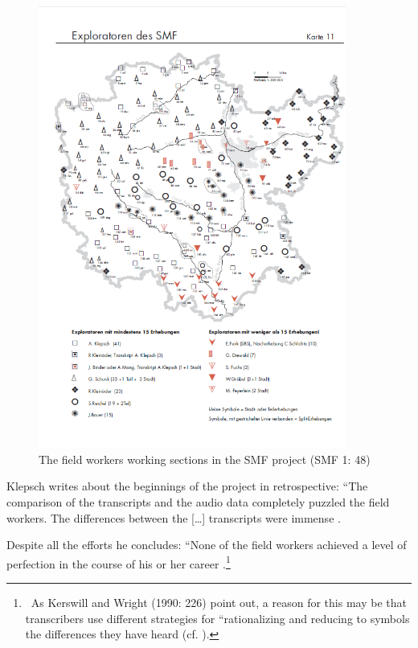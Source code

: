 \documentclass[output=paper]{LSP/langsci}
\begin{document}
\begin{figure}
\includegraphics[width=0.9\textwidth]{illustrations/mathus_fig5}
\caption{The field workers{\textquotesingle} working sections in the SMF project (SMF 1: 48)}
\label{fig:5}
\end{figure}

Klepsch writes about the beginnings of the project in retrospective: ``The comparison of the transcripts and the audio data completely puzzled the field workers. The differences between the […] transcripts were immense{\textquotedbl} \citep[25]{klepsch_wie_2013}.

Despite all the efforts he concludes: ``None of the field workers achieved a level of perfection in the course of his or her career{\textquotedbl} \citep[27]{klepsch_wie_2013}.\footnote{\ As Kerswill and Wright (1990: 226) point out, a reason for this may be that transcribers use different strategies for ``rationalizing and reducing to symbols the differences they have heard{\textquotedbl} (cf. \citealt[269]{kerswill_limits_1990}).}
\end{document}
